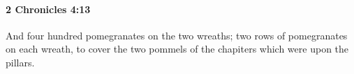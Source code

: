 
		\paragraph{2 Chronicles 4:13} %
			\label{2CHRONICLES-4-13}

			And four hundred pomegranates on the two wreaths; two rows of pomegranates on each wreath, to cover the two pommels of the chapiters which were upon the pillars.


